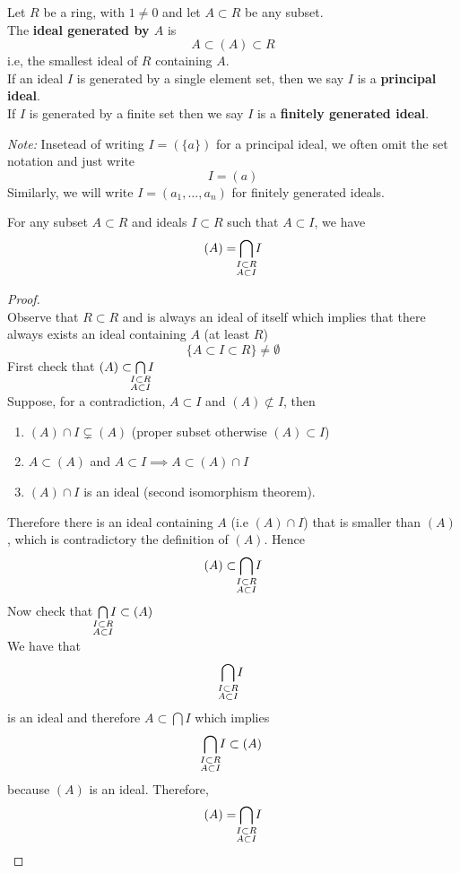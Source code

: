 \documentclass[../Main.tex]{subfiles}
\begin{document}
\begin{dfn}[title = {Ideal Generation, Principal and Finitely Generated Ideal}]
	Let $R$ be a ring, with $1\ne 0$ and let $A\subset R$ be any subset.\\
	The \textbf{ideal generated by $A$} is
	\[A\subset (A)\subset R\]
	i.e, the smallest ideal of $R$ containing $A$.\\
	If an ideal $I$ is generated by a single element set, then we say $I$ is a \textbf{principal ideal}.\\
	If $I$ is generated by a finite set then we say $I$ is a \textbf{finitely generated ideal}.
\end{dfn}
\textit{Note:} Insetead of writing $I=(\{a\})$ for a principal ideal, we often omit the set notation and just write
\[I=(a)\]
Similarly, we will write $I=(a_1,\dots, a_n)$ for finitely generated ideals.
\newpage 
\begin{prop}[title = Minimality of ideal generated by a set]
	For any subset $A \subset R$ and ideals $I\subset R$ such that $A\subset I$, we have
	\[(A)= \bigcap_{\mathclap{\substack{I \subset R\\A\subset I} } } I\]
\end{prop}
\begin{proof}~\\
	Observe that $R\subset R$ and is always an ideal of itself which implies that there always exists an ideal containing $A$ (at least $R$)
	\[\{A\subset I\subset R\} \ne \emptyset\]
	First check that $(A)\subset \bigcap\limits_{\mathclap{\substack{I \subset R \\A\subset I} } } I$\\
	Suppose, for a contradiction, $A\subset I$ and $(A) \not\subset I$, then
	\begin{enumerate}
		\item $(A) \cap I \subsetneq (A)$ (proper subset otherwise $(A)\subset I$)
		\item $A\subset (A)$ and $A\subset I \implies A\subset (A)\cap I$
		\item $(A) \cap I$ is an ideal (second isomorphism theorem).
	\end{enumerate}
	Therefore there is an ideal containing $A$ (i.e $(A) \cap I$) that is smaller than $(A)$, which is contradictory the definition of $(A)$. Hence\[(A)\subset \bigcap\limits_{\mathclap{\substack{I \subset R \\A\subset I} } } I\] 
	Now check that $\bigcap\limits_{\mathclap{\substack{I \subset R \\A\subset I} } } I\subset (A) $\\
	We have that
	\[\bigcap_{\mathclap{\substack{I \subset R\\A\subset I} } } I\] is an ideal and therefore $A\subset \bigcap I$ which implies
	\[\bigcap_{\mathclap{\substack{I \subset R \\A\subset I} } } I\subset (A) \]
	because $(A)$ is an ideal.
	Therefore,
		\[(A)= \bigcap_{\mathclap{\substack{I \subset R\\A\subset I} } } I\]
\end{proof}
\end{document}
